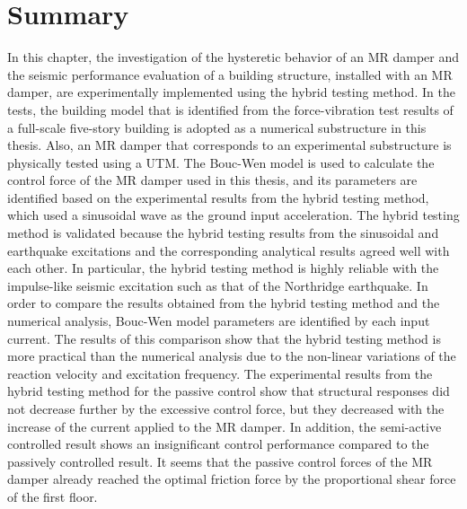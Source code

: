 \section{Summary}
In this chapter, the investigation of the hysteretic behavior of an MR damper and the seismic performance evaluation of a building structure, installed with an MR damper, are experimentally implemented using the hybrid testing method. In the tests, the building model that is identified from the force-vibration test results of a full-scale five-story building is adopted as a numerical substructure in this thesis. Also, an MR damper that corresponds to an experimental substructure is physically tested using a UTM. The Bouc-Wen model is used to calculate the control force of the MR damper used in this thesis, and its parameters are identified based on the experimental results from the hybrid testing method, which used a sinusoidal wave as the ground input acceleration. The hybrid testing method is validated because the hybrid testing results from the sinusoidal and earthquake excitations and the corresponding analytical results agreed well with each other. In particular, the hybrid testing method is highly reliable with the impulse-like seismic excitation such as that of the Northridge earthquake. In order to compare the results obtained from the hybrid testing method and the numerical analysis, Bouc-Wen model parameters are identified by each input current. The results of this comparison show that the hybrid testing method is more practical than the numerical analysis due to the non-linear variations of the reaction velocity and excitation frequency. The experimental results from the hybrid testing method for the passive control show that structural responses did not decrease further by the excessive control force, but they decreased with the increase of the current applied to the MR damper. In addition, the semi-active controlled result shows an insignificant control performance compared to the passively controlled result. It seems that the passive control forces of the MR damper already reached the optimal friction force by the proportional shear force of the first floor.